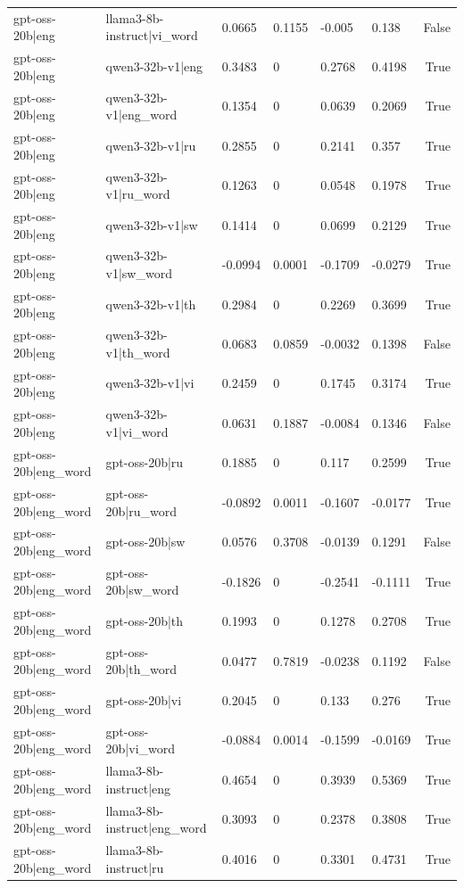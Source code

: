 \begin{table}
\begin{tabular}{llllllr}
gpt-oss-20b|eng & llama3-8b-instruct|vi_word & 0.0665 & 0.1155 & -0.005 & 0.138 & False \\
gpt-oss-20b|eng & qwen3-32b-v1|eng & 0.3483 & 0 & 0.2768 & 0.4198 & True \\
gpt-oss-20b|eng & qwen3-32b-v1|eng_word & 0.1354 & 0 & 0.0639 & 0.2069 & True \\
gpt-oss-20b|eng & qwen3-32b-v1|ru & 0.2855 & 0 & 0.2141 & 0.357 & True \\
gpt-oss-20b|eng & qwen3-32b-v1|ru_word & 0.1263 & 0 & 0.0548 & 0.1978 & True \\
gpt-oss-20b|eng & qwen3-32b-v1|sw & 0.1414 & 0 & 0.0699 & 0.2129 & True \\
gpt-oss-20b|eng & qwen3-32b-v1|sw_word & -0.0994 & 0.0001 & -0.1709 & -0.0279 & True \\
gpt-oss-20b|eng & qwen3-32b-v1|th & 0.2984 & 0 & 0.2269 & 0.3699 & True \\
gpt-oss-20b|eng & qwen3-32b-v1|th_word & 0.0683 & 0.0859 & -0.0032 & 0.1398 & False \\
gpt-oss-20b|eng & qwen3-32b-v1|vi & 0.2459 & 0 & 0.1745 & 0.3174 & True \\
gpt-oss-20b|eng & qwen3-32b-v1|vi_word & 0.0631 & 0.1887 & -0.0084 & 0.1346 & False \\
gpt-oss-20b|eng_word & gpt-oss-20b|ru & 0.1885 & 0 & 0.117 & 0.2599 & True \\
gpt-oss-20b|eng_word & gpt-oss-20b|ru_word & -0.0892 & 0.0011 & -0.1607 & -0.0177 & True \\
gpt-oss-20b|eng_word & gpt-oss-20b|sw & 0.0576 & 0.3708 & -0.0139 & 0.1291 & False \\
gpt-oss-20b|eng_word & gpt-oss-20b|sw_word & -0.1826 & 0 & -0.2541 & -0.1111 & True \\
gpt-oss-20b|eng_word & gpt-oss-20b|th & 0.1993 & 0 & 0.1278 & 0.2708 & True \\
gpt-oss-20b|eng_word & gpt-oss-20b|th_word & 0.0477 & 0.7819 & -0.0238 & 0.1192 & False \\
gpt-oss-20b|eng_word & gpt-oss-20b|vi & 0.2045 & 0 & 0.133 & 0.276 & True \\
gpt-oss-20b|eng_word & gpt-oss-20b|vi_word & -0.0884 & 0.0014 & -0.1599 & -0.0169 & True \\
gpt-oss-20b|eng_word & llama3-8b-instruct|eng & 0.4654 & 0 & 0.3939 & 0.5369 & True \\
gpt-oss-20b|eng_word & llama3-8b-instruct|eng_word & 0.3093 & 0 & 0.2378 & 0.3808 & True \\
gpt-oss-20b|eng_word & llama3-8b-instruct|ru & 0.4016 & 0 & 0.3301 & 0.4731 & True \\

\end{tabular}
\end{table}
